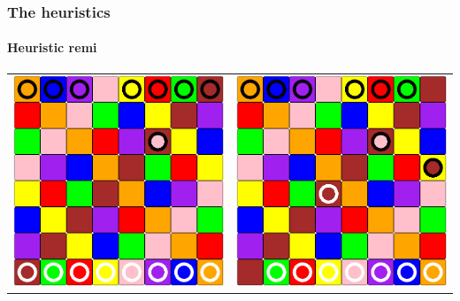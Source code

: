 \documentclass[a4paper, 11pt]{beamer}
\begin{document}
\begin{frame}
\frametitle{The heuristics}
\framesubtitle{Heuristic remi}
\begin{table}[htbp]
  \centering
  \begin{tabular}{c c}
    \includegraphics[scale = 0.12]{remi1b.png} & \includegraphics[scale = 0.12]{remi2b.png} \\

\end{tabular}
\end{table}
\end{frame}
\end{document}
